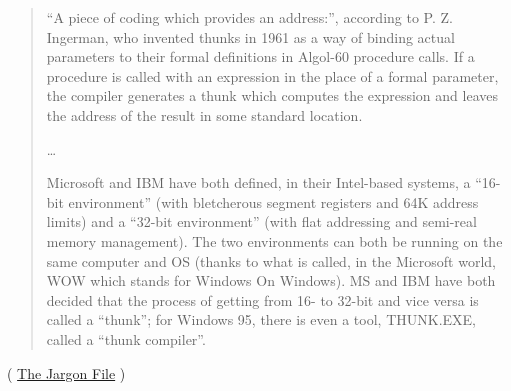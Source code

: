 \begin{framed}
\begin{quotation}
“A piece of coding which provides an address:”, according to P. Z. Ingerman, 
who invented thunks in 1961 as a way of binding actual parameters to their formal 
definitions in Algol-60 procedure calls. If a procedure is called with an expression 
in the place of a formal parameter, the compiler generates a thunk which computes 
the expression and leaves the address of the result in some standard location.

\dots

Microsoft and IBM have both defined, in their Intel-based systems, a “16-bit environment” 
(with bletcherous segment registers and 64K address limits) and a “32-bit environment” 
(with flat addressing and semi-real memory management). The two environments can both be 
running on the same computer and OS (thanks to what is called, in the Microsoft world, 
WOW which stands for Windows On Windows). MS and IBM have both decided that the process 
of getting from 16- to 32-bit and vice versa is called a “thunk”; for Windows 95, 
there is even a tool, THUNK.EXE, called a “thunk compiler”.
\end{quotation}
\end{framed}
( \href{http://go.yurichev.com/17362}{The Jargon File} )

